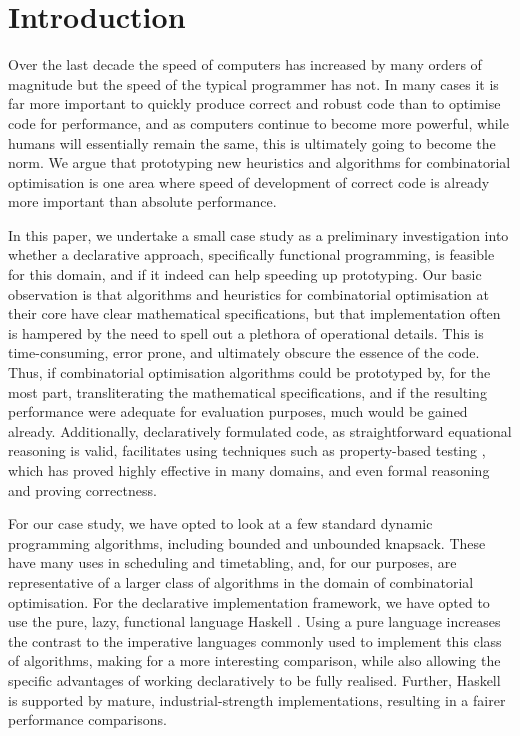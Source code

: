 \section{Introduction}

Over the last decade the speed of computers has increased by many orders of
magnitude but the speed of the typical programmer has not. In many cases it is
far more important to quickly produce correct and robust code than to optimise
code for performance, and as computers continue to become more powerful, while
humans will essentially remain the same, this is ultimately going to become
the norm. We argue that prototyping new heuristics and algorithms for
combinatorial optimisation is one area where speed of development of correct
code is already more important than absolute performance.

In this paper, we undertake a small case study as a preliminary investigation
into whether a declarative approach, specifically functional programming, is
feasible for this domain, and if it indeed can help speeding up prototyping.
Our basic observation is that algorithms and heuristics for combinatorial
optimisation at their core have clear mathematical specifications, but that
implementation often is hampered by the need to spell out a plethora of
operational details. This is time-consuming, error prone, and ultimately
obscure the essence of the code. Thus, if combinatorial optimisation
algorithms could be prototyped by, for the most part, transliterating the
mathematical specifications, and if the resulting performance were adequate
for evaluation purposes, much would be gained already. Additionally,
declaratively formulated code, as straightforward equational reasoning is
valid, facilitates using techniques such as property-based testing
\cite{quickcheck}, which has proved highly effective in many domains, and even
formal reasoning and proving correctness.

For our case study, we have opted to look at a few standard dynamic
programming algorithms, including bounded and unbounded knapsack. These have
many uses in scheduling and timetabling, and, for our purposes, are
representative of a larger class of algorithms in the domain of combinatorial
optimisation. For the declarative implementation framework, we have opted to
use the pure, lazy, functional language Haskell \cite{Haskell98Book}. Using a
pure language increases the contrast to the imperative languages commonly used
to implement this class of algorithms, making for a more interesting
comparison, while also allowing the specific advantages of working
declaratively
to be fully realised. Further, Haskell is supported by mature,
industrial-strength implementations, resulting in a fairer performance
comparisons.

